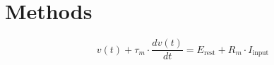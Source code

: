 \chapter{Methods}
\label{chap:methods}


\[
v(t) + \tau_m \cdot \frac{{dv(t)}}{{dt}} = E_{\text{rest}} + R_m \cdot I_{\text{input}}
\]